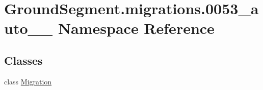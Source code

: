 \hypertarget{namespace_ground_segment_1_1migrations_1_10053__auto__20170325__1256}{}\section{Ground\+Segment.\+migrations.0053\+\_\+auto\+\_\+\_ Namespace Reference}
\label{namespace_ground_segment_1_1migrations_1_10053__auto__20170325__1256}
\subsection*{Classes}
\begin{DoxyCompactItemize}
\item 
class \hyperlink{class_ground_segment_1_1migrations_1_10053__auto__20170325__1256_1_1_migration}{Migration}
\end{DoxyCompactItemize}

